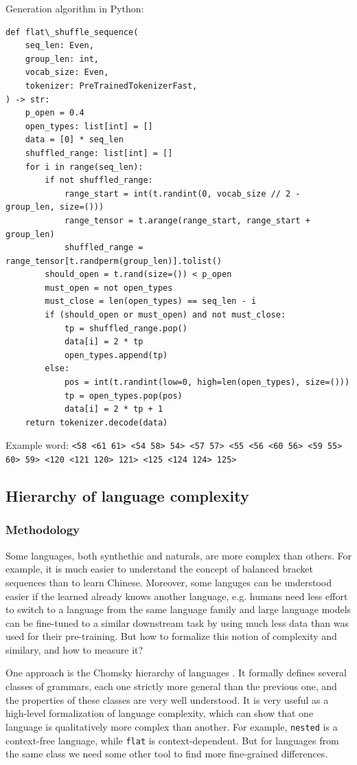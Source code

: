 \documentclass[a4paper, 11pt, oneside]{article}
\begin{document}
	Generation algorithm in Python:

	\begin{verbatim}
def flat\_shuffle_sequence(
    seq_len: Even,
    group_len: int,
    vocab_size: Even,
    tokenizer: PreTrainedTokenizerFast,
) -> str:
    p_open = 0.4
    open_types: list[int] = []
    data = [0] * seq_len
    shuffled_range: list[int] = []
    for i in range(seq_len):
        if not shuffled_range:
            range_start = int(t.randint(0, vocab_size // 2 - group_len, size=()))
            range_tensor = t.arange(range_start, range_start + group_len)
            shuffled_range = range_tensor[t.randperm(group_len)].tolist()
        should_open = t.rand(size=()) < p_open
        must_open = not open_types
        must_close = len(open_types) == seq_len - i
        if (should_open or must_open) and not must_close:
            tp = shuffled_range.pop()
            data[i] = 2 * tp
            open_types.append(tp)
        else:
            pos = int(t.randint(low=0, high=len(open_types), size=()))
            tp = open_types.pop(pos)
            data[i] = 2 * tp + 1
    return tokenizer.decode(data)
\end{verbatim}

	Example word: \verb|<58 <61 61> <54 58> 54> <57 57> <55 <56 <60 56> <59 55> 60> 59> <120 <121 120> 121> <125 <124 124> 125>|

	\subsection{Hierarchy of language complexity}

	\subsubsection{Methodology}

	Some languages, both synthethic and naturals, are more complex than others. For
	example, it is much easier to understand the concept of balanced bracket
	sequences than to learn Chinese. Moreover, some languges can be understood
	easier if the learned already knows another language, e.g. humans need less
	effort to switch to a language from the same language family and large
	language models can be fine-tuned to a similar downstream task by using much
	less data than was used for their pre-training. But how to formalize this notion
	of complexity and similary, and how to measure it?

	One approach is the Chomsky hierarchy of languages \cite{chomsky1956three}. It
	formally defines several classes of grammars, each one strictly more general
	than the previous one, and the properties of these classes are very well understood.
	It is very useful as a high-level formalization of language complexity, which can
	show that one language is qualitatively more complex than another. For example,
	\texttt{nested} is a context-free language, while \texttt{flat} is context-dependent.
	But for languages from the same class we need some other tool to find more fine-grained
	differences.
\end{document}
